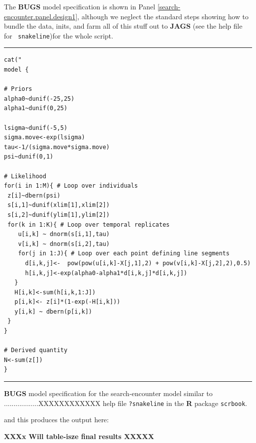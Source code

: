 The {\bf BUGS} model specification is shown in Panel 
\ref{search-encounter.panel.design1}, although we neglect the standard
steps showing how to 
bundle the data, inits, and farm
all of this stuff out to {\bf JAGS} (see the help file for \mbox{\tt
  snakeline})for the whole script.

\begin{panel}[htp]
\centering
\rule[0.15in]{\textwidth}{.03in}
{\small
\begin{verbatim}
cat("
model {

# Priors
alpha0~dunif(-25,25)
alpha1~dunif(0,25)

lsigma~dunif(-5,5)
sigma.move<-exp(lsigma)
tau<-1/(sigma.move*sigma.move)
psi~dunif(0,1)

# Likelihood
for(i in 1:M){ # Loop over individuals
 z[i]~dbern(psi)
 s[i,1]~dunif(xlim[1],xlim[2])
 s[i,2]~dunif(ylim[1],ylim[2])
 for(k in 1:K){ # Loop over temporal replicates
    u[i,k] ~ dnorm(s[i,1],tau)
    v[i,k] ~ dnorm(s[i,2],tau)
    for(j in 1:J){ # Loop over each point defining line segments
      d[i,k,j]<-  pow(pow(u[i,k]-X[j,1],2) + pow(v[i,k]-X[j,2],2),0.5)
      h[i,k,j]<-exp(alpha0-alpha1*d[i,k,j]*d[i,k,j])
   }
   H[i,k]<-sum(h[i,k,1:J])
   p[i,k]<- z[i]*(1-exp(-H[i,k]))
   y[i,k] ~ dbern(p[i,k])
 }
}

# Derived quantity
N<-sum(z[])
}
\end{verbatim}
}
\rule[-0.15in]{\textwidth}{.03in}
\caption{
{\bf BUGS} model specification for the search-encounter model similar
to ..................XXXXXXXXXXXX
help file \mbox{\tt ?snakeline} in the {\bf R} package \mbox{\tt scrbook}.
}
\label{search-encounter.panel.design1}
\end{panel}


and this produces the output here:

{\bf XXXx Will table-isze final results XXXXX}

